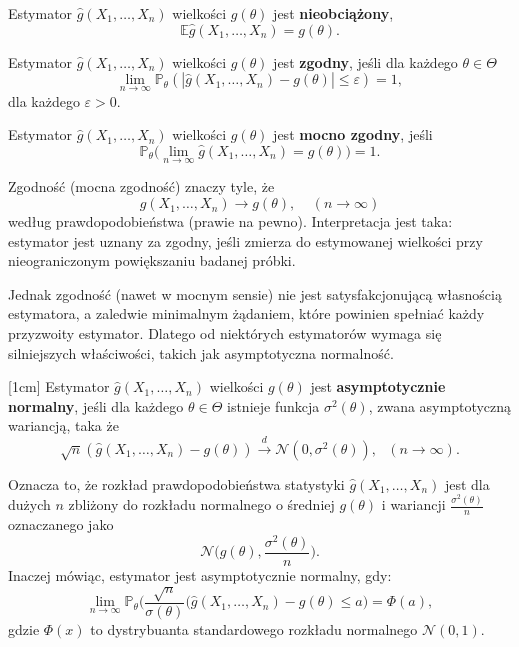 \begin{definition}
Estymator $\hat{g}(X_1, \dots , X_n)$ wielkości $g(\theta)$ jest \textbf{nieobciążony},  
$$\mathbb{E}\hat{g}(X_1, \dots , X_n) = g(\theta).$$

\end{definition}

\begin{definition}
Estymator $\hat{g}(X_1, \dots , X_n)$ wielkości $g(\theta)$ jest \textbf{zgodny},
jeśli dla każdego $\theta \in \Theta$
$$ \lim\limits_{n \rightarrow \infty} \mathbb{P}_{\theta}(|\hat{g}(X_1,\dots,X_n) -g(\theta)| \leq \varepsilon ) = 1,$$
dla każdego $\varepsilon > 0.$
\end{definition}

\begin{definition}
Estymator $\hat{g}(X_1, \dots , X_n)$ wielkości $g(\theta)$ jest \textbf{mocno zgodny},
jeśli %
$$\mathbb{P}_{\theta}\Big(\lim\limits_{n \rightarrow \infty}\hat{g}(X_1,\dots,X_n)=g(\theta) \Big) = 1.$$
\end{definition}


Zgodność (mocna zgodność) znaczy tyle, że
$$\hat{g}(X_1, \dots , X_n) \rightarrow g(\theta), \ \ \ \ \ (n \rightarrow \infty)$$
według prawdopodobieństwa (prawie na pewno). Interpretacja jest taka: estymator jest uznany za
zgodny, jeśli zmierza do estymowanej wielkości przy nieograniczonym powiększaniu badanej próbki.

Jednak zgodność (nawet w mocnym sensie) nie jest satysfakcjonującą własnością estymatora,
a zaledwie minimalnym żądaniem, które powinien spełniać każdy przyzwoity estymator. Dlatego od niektórych estymatorów wymaga się silniejszych właściwości, takich jak asymptotyczna normalność.

\begin{definition}
[1cm]
Estymator $\hat{g}(X_1, \dots , X_n)$ wielkości $g(\theta)$ jest \textbf{asymptotycznie normalny}, jeśli dla każdego $\theta \in \Theta$ istnieje funkcja $\sigma^2(\theta)$, zwana asymptotyczną wariancją, taka że
$$\sqrt{n}(\hat{g}(X_1,\dots,X_n) -g(\theta))  \overset{d}{\rightarrow} \mathcal{N}(0, \sigma^2(\theta)), \ \ \ (n \rightarrow \infty).$$
\end{definition}


Oznacza to, że rozkład prawdopodobieństwa statystyki $\hat{g}(X_1,\dots,X_n)$ jest dla dużych $n$ zbliżony do rozkładu normalnego o średniej $g(\theta)$ i wariancji $\frac{\sigma^2(\theta)}{n}$ oznaczanego jako $$\mathcal{N}\Big(g(\theta), \dfrac{\sigma^2(\theta)}{n}\Big).$$ Inaczej mówiąc, estymator jest asymptotycznie normalny, gdy: 
$$\lim\limits_{n \rightarrow \infty} \mathbb{P}_{\theta} \Big(\dfrac{\sqrt{n}}{\sigma(\theta)}(\hat{g}(X_1,\dots,X_n) -g(\theta) \leq a \Big) = \Phi(a),$$
gdzie $\Phi(x)$ to dystrybuanta standardowego rozkładu normalnego $\mathcal{N}(0,1)$.

